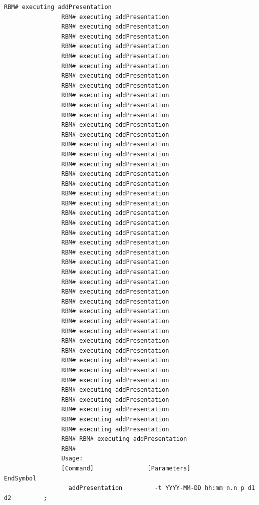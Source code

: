 \documentclass{article}
\begin{document}
\begin{Verbatim}[gobble=8]
                RBM# executing addPresentation
                RBM# executing addPresentation
                RBM# executing addPresentation
                RBM# executing addPresentation
                RBM# executing addPresentation
                RBM# executing addPresentation
                RBM# executing addPresentation
                RBM# executing addPresentation
                RBM# executing addPresentation
                RBM# executing addPresentation
                RBM# executing addPresentation
                RBM# executing addPresentation
                RBM# executing addPresentation
                RBM# executing addPresentation
                RBM# executing addPresentation
                RBM# executing addPresentation
                RBM# executing addPresentation
                RBM# executing addPresentation
                RBM# executing addPresentation
                RBM# executing addPresentation
                RBM# executing addPresentation
                RBM# executing addPresentation
                RBM# executing addPresentation
                RBM# executing addPresentation
                RBM# executing addPresentation
                RBM# executing addPresentation
                RBM# executing addPresentation
                RBM# executing addPresentation
                RBM# executing addPresentation
                RBM# executing addPresentation
                RBM# executing addPresentation
                RBM# executing addPresentation
                RBM# executing addPresentation
                RBM# executing addPresentation
                RBM# executing addPresentation
                RBM# executing addPresentation
                RBM# executing addPresentation
                RBM# executing addPresentation
                RBM# executing addPresentation
                RBM# executing addPresentation
                RBM# executing addPresentation
                RBM# executing addPresentation
                RBM# executing addPresentation
                RBM# executing addPresentation
                RBM# RBM# executing addPresentation
                RBM# 
                Usage: 
                [Command]               [Parameters]                            EndSymbol     
                  addPresentation         -t YYYY-MM-DD hh:mm n.n p d1 d2         ;           
                

\end{Verbatim}
\end{document}
